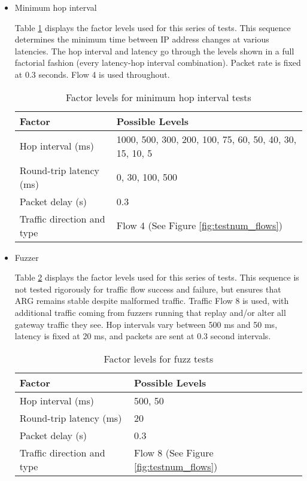 \begin{itemize}
	\item Minimum hop interval 
	\par Table \ref{tbl:hoprate_factors} displays the factor levels used for this series of tests. This sequence determines the minimum time between \ac{IP} address changes at various latencies. The hop interval and latency go through the levels shown in a full factorial fashion (every latency-hop interval combination). Packet rate is fixed at 0.3 seconds. Flow 4 is used throughout.

\begin{table}
\caption{Factor levels for minimum hop interval tests}
\label{tbl:hoprate_factors}
\centering
\begin{tabular}{l|l}
\textbf{Factor} & \textbf{Possible Levels} \\
\hline
Hop interval (ms) & 1000, 500, 300, 200, 100, 75, 60, 50, 40, 30, 15, 10, 5\\
Round-trip latency (ms) & 0, 30, 100, 500\\
Packet delay (s) & 0.3\\
Traffic direction and type & Flow 4 (See Figure \ref{fig:testnum_flows})
\end{tabular}
\end{table}

	\item Fuzzer
	\par Table \ref{tbl:fuzz_factors} displays the factor levels used for this series of tests. This sequence is not tested rigorously for traffic flow success and failure, but ensures that \ac{ARG} remains stable despite malformed traffic. Traffic Flow 8 is used, with additional traffic coming from fuzzers running that replay and/or alter all gateway traffic they see. Hop intervals vary between 500 ms and 50 ms, latency is fixed at 20 ms, and packets are sent at 0.3 second intervals.

\begin{table}
\caption{Factor levels for fuzz tests}
\label{tbl:fuzz_factors}
\centering
\begin{tabular}{l|l}
\textbf{Factor} & \textbf{Possible Levels} \\
\hline
Hop interval (ms) & 500, 50\\
Round-trip latency (ms) & 20\\
Packet delay (s) & 0.3\\
Traffic direction and type & Flow 8 (See Figure \ref{fig:testnum_flows})
\end{tabular}
\end{table}
\end{itemize}


